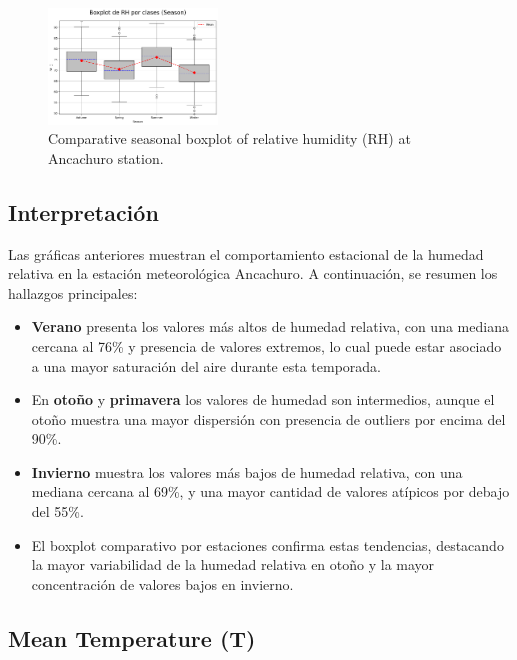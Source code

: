 \vspace{0.2cm}

\begin{figure}[H]
\centering
\includegraphics[width=0.4\textwidth]{resultados/por_estacion_del_anio/boxplot_clases_por_estacion/Ancachuro/RH_ClassBoxplot_Season.png}
\caption{Comparative seasonal boxplot of relative humidity (RH) at Ancachuro station.}
\label{fig:ancachuro_rh_box}
\end{figure}

\subsection*{Interpretación}

Las gráficas anteriores muestran el comportamiento estacional de la humedad relativa en la estación meteorológica Ancachuro. A continuación, se resumen los hallazgos principales:

\begin{itemize}
    \item \textbf{Verano} presenta los valores más altos de humedad relativa, con una mediana cercana al 76\% y presencia de valores extremos, lo cual puede estar asociado a una mayor saturación del aire durante esta temporada.
    \item En \textbf{otoño} y \textbf{primavera} los valores de humedad son intermedios, aunque el otoño muestra una mayor dispersión con presencia de outliers por encima del 90\%.
    \item \textbf{Invierno} muestra los valores más bajos de humedad relativa, con una mediana cercana al 69\%, y una mayor cantidad de valores atípicos por debajo del 55\%.
    \item El boxplot comparativo por estaciones confirma estas tendencias, destacando la mayor variabilidad de la humedad relativa en otoño y la mayor concentración de valores bajos en invierno.
\end{itemize}


\subsection{Mean Temperature (T)}

